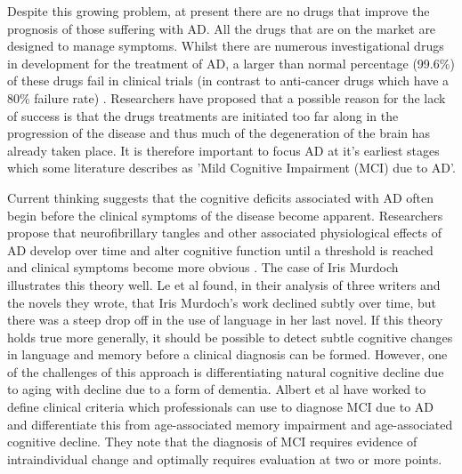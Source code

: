 \documentclass{article}
\begin{document}
\par
Despite this growing problem, at present there are no drugs that improve the prognosis of those suffering with AD. All the drugs that are on the market are designed to manage symptoms. Whilst there are numerous investigational drugs in development for the treatment of AD, a larger than normal percentage (99.6\%) of these drugs fail in clinical trials (in contrast to anti-cancer drugs which have a 80\% failure rate) \cite{Alzheimer2016}. Researchers have proposed that a possible reason for the lack of success is that the drugs treatments are initiated too far along in the progression of the disease and thus much of the degeneration of the brain has already taken place. It is therefore important to focus AD at it's earliest stages which some literature describes as 'Mild Cognitive Impairment (MCI) due to AD'.
\par
Current thinking suggests that the cognitive deficits associated with AD often begin before the clinical symptoms of the disease become apparent. Researchers propose that neurofibrillary tangles and other associated physiological effects of AD develop over time and alter cognitive function until a threshold is reached and clinical symptoms become more obvious \cite{Nestor2006}. The case of Iris Murdoch illustrates this theory well. Le et al \cite{Le2012}found, in their analysis of three writers and the novels they wrote, that Iris Murdoch's work declined subtly over time, but there was a steep drop off in the use of language in her last novel. If this theory holds true more generally, it should be possible to detect subtle cognitive changes in language and memory before a clinical diagnosis can be formed. However, one of the challenges of this approach is differentiating natural cognitive decline due to aging with decline due to a form of dementia. Albert et al have worked to define clinical criteria which professionals can use to diagnose MCI due to AD and differentiate this from age-associated memory impairment and age-associated cognitive decline. They note that the diagnosis of MCI requires evidence of intraindividual change and optimally requires evaluation at two or more points.
\end{document}
